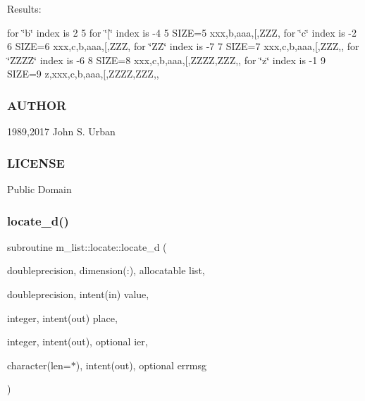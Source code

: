 Results\+:

for \char`\"{}b\char`\"{} index is 2 5 for \char`\"{}\mbox{[}\char`\"{} index is -\/4 5 S\+I\+ZE=5 xxx,b,aaa,\mbox{[},Z\+ZZ, for \char`\"{}c\char`\"{} index is -\/2 6 S\+I\+ZE=6 xxx,c,b,aaa,\mbox{[},Z\+ZZ, for \char`\"{}\+Z\+Z\char`\"{} index is -\/7 7 S\+I\+ZE=7 xxx,c,b,aaa,\mbox{[},Z\+ZZ,, for \char`\"{}\+Z\+Z\+Z\+Z\char`\"{} index is -\/6 8 S\+I\+ZE=8 xxx,c,b,aaa,\mbox{[},Z\+Z\+ZZ,Z\+ZZ,, for \char`\"{}z\char`\"{} index is -\/1 9 S\+I\+ZE=9 z,xxx,c,b,aaa,\mbox{[},Z\+Z\+ZZ,Z\+ZZ,,

\subsubsection*{A\+U\+T\+H\+OR}

1989,2017 John S. Urban \subsubsection*{L\+I\+C\+E\+N\+SE}

Public Domain \mbox{\label{interfacem__list_1_1locate_a7e7b4cfcb8a8c34716711ce9ba2b29f9}} 
\subsubsection{\texorpdfstring{locate\+\_\+d()}{locate\_d()}}
{\footnotesize\ttfamily subroutine m\+\_\+list\+::locate\+::locate\+\_\+d (\begin{DoxyParamCaption}\item[{doubleprecision, dimension(\+:), allocatable}]{list,  }\item[{doubleprecision, intent(in)}]{value,  }\item[{integer, intent(out)}]{place,  }\item[{integer, intent(out), optional}]{ier,  }\item[{character(len=$\ast$), intent(out), optional}]{errmsg }\end{DoxyParamCaption})\hspace{0.3cm}{\ttfamily [private]}}

\mbox{\label{interfacem__list_1_1locate_afceca3ebd5e49e34831b80347b159066}} 

